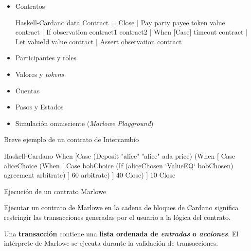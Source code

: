 \documentclass{beamer}
\newcommand{\nologo}{\setbeamertemplate{logo}{}} %
\begin{document}
{\nologo
\begin{frame}[fragile]
\begin{itemize}
    \item Contratos
        \pause

\begin{code}{Haskell-Cardano}
data Contract = Close
              | Pay party payee token value contract
              | If observation contract1 contract2
              | When [Case] timeout contract
              | Let valueId value contract
              | Assert observation contract
\end{code}
        \pause
    \item Participantes y roles
        \pause
    \item Valores y \textit{tokens}
        \pause
    \item Cuentas
        \pause
    \item Pasos y Estados
        \pause
    \item Simulación omnisciente (\textit{Marlowe Playground})

\end{itemize}
\end{frame}
}

\begin{frame}[fragile]{Breve ejemplo de un contrato de Intercambio}
\begin{code}{Haskell-Cardano}
When [Case (Deposit "alice" "alice" ada price)   
        (When [ Case aliceChoice
                  (When [ Case bobChoice
                            (If (aliceChosen `ValueEQ` bobChosen)
                                 agreement
                                 arbitrate) 
                        ]
                        60
                        arbitrate)
              ]
              40
              Close)
     ]
     10       
     Close    
\end{code}

\end{frame}

\begin{frame}{Ejecución de un contrato Marlowe}

Ejecutar un contrato de Marlowe en la cadena de bloques de Cardano significa restringir las transacciones generadas por el usuario a la lógica del contrato.
\bigskip
\pause

Una \textbf{transacción} contiene una \textbf{lista ordenada de \textit{entradas} o \textit{acciones}}. El intérprete de Marlowe se ejecuta durante la validación de transacciones. 

\end{frame}
\end{document}
